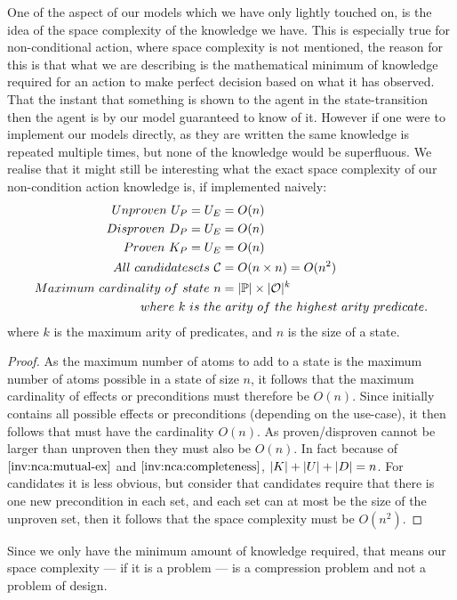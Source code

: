 \documentclass[../Master.tex]{subfiles}
\begin{document}
One of the aspect of our models which we have only lightly touched on, is the idea of the space complexity of the knowledge we have.
This is especially true for non-conditional action, where space complexity is not mentioned, 
the reason for this is that what we are describing is the mathematical minimum of knowledge required for an action to make perfect decision based on what it has observed.
That the instant that something is shown to the agent in the state-transition then the agent is by our model guaranteed to know of it.
However if one were to implement our models directly, as they are written the same knowledge is repeated multiple times, but none of the knowledge would be superfluous.
We realise that it might still be interesting what the exact space complexity of our non-condition action knowledge is, if implemented naively:
 \begin{align*}
 	Unproven ~U_P = U_E & = O(n) \\
 	Disproven~D_P = U_E & = O(n) \\
 	Proven~K_P = U_E &= O(n) \\
 	All ~ candidate sets~ \mathcal{C} & = O(n \times n)=O(n^2) \\
 	Maximum ~ cardinality~ of ~ state  ~ n & = |\mathbb{P}| \times |\mathcal{O}|^k \\
 	where ~ k ~ is ~ the&  ~ arity ~ of ~ the~ highest~ arity ~ predicate.
 \end{align*} 
 where $k$ is the maximum arity of predicates, and $n$ is the size of a state.
 \begin{proof} 
 	As the maximum number of atoms to add to a state is the maximum number of atoms possible in a state of size $n$,
 	it follows that the maximum cardinality of effects or preconditions must therefore be $O(n)$.
Since \up initially contains all possible effects or preconditions (depending on the use-case), 
	it then follows that \Up must have the cardinality $O(n)$. 
	As proven/disproven cannot be larger than unproven then they must also be $O(n)$.
	In fact because of $\Cref{inv:nca:mutual-ex}$ and $\Cref{inv:nca:completeness}$, $|K|+|U|+|D| = n$.
	For candidates it is less obvious, but consider that candidates require that there is one new precondition in
	each set, and each set can at most be the size of the unproven set, then it follows that the space complexity must be $O(n^2)$.
 \end{proof}
Since we only have the minimum amount of knowledge required, that means our space complexity --- if it is a problem --- is a compression problem and not a problem of design. 
\end{document}

